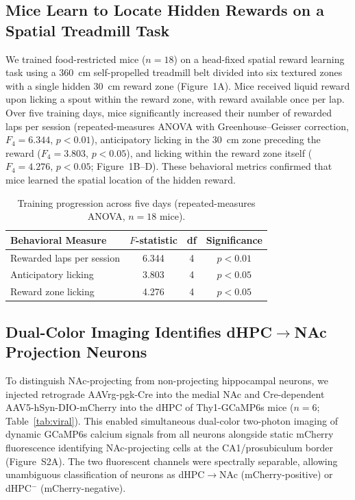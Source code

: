 \documentclass[11pt]{article}
\begin{document}
\subsection{Mice Learn to Locate Hidden Rewards on a Spatial Treadmill Task}

We trained food-restricted mice ($n = 18$) on a head-fixed spatial reward learning task using a 360~cm self-propelled treadmill belt divided into six textured zones with a single hidden 30~cm reward zone (Figure~1A). Mice received liquid reward upon licking a spout within the reward zone, with reward available once per lap. Over five training days, mice significantly increased their number of rewarded laps per session (repeated-measures ANOVA with Greenhouse--Geisser correction, $F_{4} = 6.344$, $p < 0.01$), anticipatory licking in the 30~cm zone preceding the reward ($F_{4} = 3.803$, $p < 0.05$), and licking within the reward zone itself ($F_{4} = 4.276$, $p < 0.05$; Figure~1B--D). These behavioral metrics confirmed that mice learned the spatial location of the hidden reward.

\begin{table}[H]
\centering
\caption{Training progression across five days (repeated-measures ANOVA, $n = 18$ mice).}
\label{tab:training}
\begin{tabular}{lccc}
\toprule
Behavioral Measure & $F$-statistic & df & Significance \\
\midrule
Rewarded laps per session & 6.344 & 4 & $p < 0.01$ \\
Anticipatory licking & 3.803 & 4 & $p < 0.05$ \\
Reward zone licking & 4.276 & 4 & $p < 0.05$ \\
\bottomrule
\end{tabular}
\end{table}

\subsection{Dual-Color Imaging Identifies dHPC$\to$NAc Projection Neurons}

To distinguish NAc-projecting from non-projecting hippocampal neurons, we injected retrograde AAVrg-pgk-Cre into the medial NAc and Cre-dependent AAV5-hSyn-DIO-mCherry into the dHPC of Thy1-GCaMP6s mice ($n = 6$; Table~\ref{tab:viral}). This enabled simultaneous dual-color two-photon imaging of dynamic GCaMP6s calcium signals from all neurons alongside static mCherry fluorescence identifying NAc-projecting cells at the CA1/prosubiculum border (Figure~S2A). The two fluorescent channels were spectrally separable, allowing unambiguous classification of neurons as dHPC$\to$NAc (mCherry-positive) or dHPC$^-$ (mCherry-negative).
\end{document}
